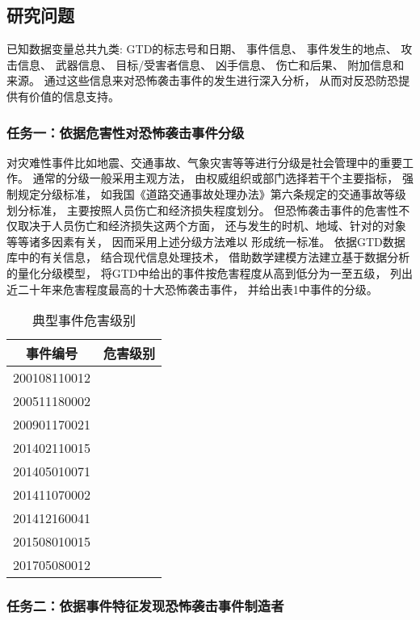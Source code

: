 \documentclass[bwprint]{gmcmthesis}
\begin{document}
\subsection{研究问题}

已知数据变量总共九类:
GTD的标志号和日期、
事件信息、
事件发生的地点、
攻击信息、
武器信息、
目标/受害者信息、
凶手信息、
伤亡和后果、
附加信息和来源。
通过这些信息来对恐怖袭击事件的发生进行深入分析，
从而对反恐防恐提供有价值的信息支持。

\subsubsection{任务一：依据危害性对恐怖袭击事件分级}

对灾难性事件比如地震、交通事故、气象灾害等等进行分级是社会管理中的重要工作。
通常的分级一般采用主观方法，
由权威组织或部门选择若干个主要指标，
强制规定分级标准，
如我国《道路交通事故处理办法》第六条规定的交通事故等级划分标准，
主要按照人员伤亡和经济损失程度划分。
但恐怖袭击事件的危害性不仅取决于人员伤亡和经济损失这两个方面，
还与发生的时机、地域、针对的对象等等诸多因素有关，
因而采用上述分级方法难以
形成统一标准。
依据GTD数据库中的有关信息，
结合现代信息处理技术，
借助数学建模方法建立基于数据分析的量化分级模型，
将GTD中给出的事件按危害程度从高到低分为一至五级，
列出近二十年来危害程度最高的十大恐怖袭击事件，
并给出表1中事件的分级。


\begin{table}
\centering
\caption{典型事件危害级别}
\begin{tabular}{|c|c|}
  \hline
  事件编号 & 危害级别 \\
  \hline
  200108110012 &   \\
  \hline
  200511180002 &   \\
  \hline
  200901170021 &   \\
  \hline
  201402110015 &   \\
  \hline
  201405010071 &   \\
  \hline
  201411070002 &   \\
  \hline
  201412160041 &   \\
  \hline
  201508010015 &   \\
  \hline
  201705080012 &   \\
  \hline
\end{tabular}
\end{table}


\subsubsection{任务二：依据事件特征发现恐怖袭击事件制造者}
\end{document}
